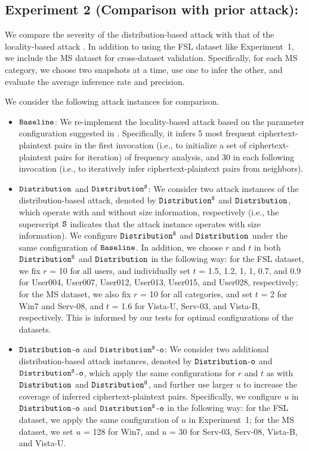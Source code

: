 \subsection{Experiment 2 (Comparison with prior attack):}
We compare the severity of the distribution-based attack with that of the
locality-based attack \cite{li17}. In addition to using the FSL dataset like
Experiment~1, we include the MS dataset for cross-dataset validation.
Specifically, for each MS category, we choose two snapshots at a time, use one
to infer the other, and evaluate the average inference rate and precision. 

We consider the following attack instances for comparison. 
%
\begin{itemize}[leftmargin=*]
\item 
$\tt Baseline$: We re-implement the locality-based attack based on the
parameter configuration suggested in \cite{li17}. Specifically, it infers 5
most frequent ciphertext-plaintext pairs in the first invocation (i.e., to
initialize a set of ciphertext-plaintext pairs for iteration) of frequency
analysis, and 30 in each following invocation (i.e., to iteratively infer ciphertext-plaintext pairs from 
 neighbors).  
\item 
$\tt Distribution$ and $\tt Distribution^S$: We consider two attack instances
of the distribution-based attack, denoted by $\tt Distribution^S$ and ${\tt
Distribution}$, which operate with and without size information,
        respectively (i.e., the superscript $\tt S$ indicates that the attack instance operates with size information). 
        We configure $\tt Distribution^S$ and ${\tt Distribution}$
under the same configuration of  ${\tt Baseline}$. In addition, we choose
$r$ and $t$ in both  $\tt Distribution^S$ and ${\tt Distribution}$ in the following way: for the FSL dataset, we fix $r$ = 10 for
all users, and individually set $t$ = 1.5, 1.2, 1, 1, 0.7, and 0.9 for
User004, User007, User012, User013, User015, and User028, respectively; for
the MS dataset, we also fix $r$ = 10 for all categories, and set $t$ = 2 for
Win7 and Serv-08, and $t$ = 1.6 for Vista-U, Serv-03, and Vista-B, respectively.
This is informed by our tests for optimal configurations of the datasets.   
\item 
$\tt Distribution$-$\tt o$ and $\tt Distribution^S$-$\tt o$:
We consider two additional distribution-based attack instances, denoted by $\tt Distribution$-$\tt o$
and $\tt Distribution^S$-$\tt o$, which apply the same configurations for $r$ and $t$ as with $\tt Distribution$ and $\tt
Distribution^S$, and further use larger $u$ to increase the
coverage of inferred ciphertext-plaintext pairs.  
        Specifically, we configure $u$ in $\tt Distribution$-$\tt o$
and $\tt Distribution^S$-$\tt o$ in the following way:  
        for the FSL
dataset, we apply the same configuration of $u$ in Experiment~1; for the MS
dataset, we set $u$ = 128 for Win7, and $u$ = 30 for Serv-03, Serv-08,
Vista-B, and Vista-U. 
\end{itemize}

